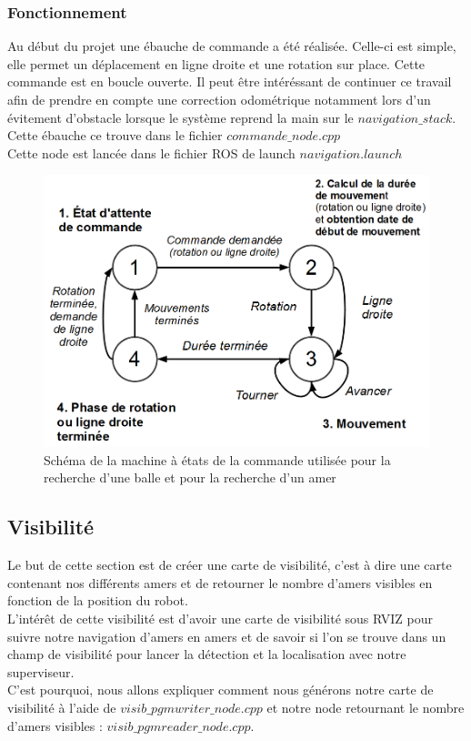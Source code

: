 \documentclass[10pt,a4paper]{article}
\begin{document}
\subsubsection*{Fonctionnement}

Au début du projet une ébauche de commande a été réalisée. Celle-ci est simple, elle permet un déplacement en ligne droite et une rotation sur place. Cette commande est en boucle ouverte. Il peut \^etre intéréssant de continuer ce travail afin de prendre en compte une correction odométrique notamment lors d'un évitement d'obstacle lorsque le système reprend la main sur le $navigation\_stack$.\\
Cette ébauche ce trouve dans le fichier $commande\_node.cpp$ \\
Cette node est lancée dans le fichier ROS de launch $navigation.launch$


\begin{figure}[!h]
\centering\includegraphics[scale=0.4]{figures/commande_MEF.png}
\caption{Schéma de la machine à états de la commande utilisée pour la recherche d'une balle et pour la recherche d'un amer}
\label{commande_MEF}
\end{figure}

\subsection{Visibilité}
\label{sec:Visibilite}

Le but de cette section est de créer une carte de visibilité, c'est à dire une carte contenant nos différents amers et de retourner le nombre d'amers visibles en fonction de la position du robot.\\
L’intérêt de cette visibilité est d'avoir une carte de visibilité sous RVIZ pour suivre notre navigation d'amers en amers et de savoir si l'on se trouve dans un champ de visibilité pour lancer la détection et la localisation avec notre superviseur.\\
C'est pourquoi, nous allons expliquer comment nous générons notre carte de visibilité à l'aide de $visib\_pgmwriter\_node.cpp$ et notre node retournant le nombre d'amers visibles : $visib\_pgmreader\_node.cpp$.
\end{document}
